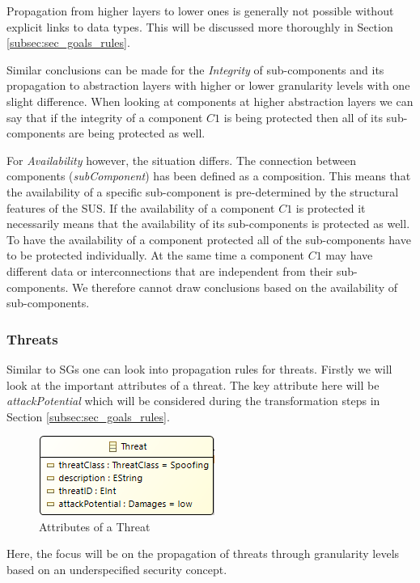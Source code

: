 Propagation from higher layers to lower ones is generally not possible without explicit links to data types. This will be discussed more thoroughly in Section \ref{subsec:sec_goals_rules}.

Similar conclusions can be made for the \textit{Integrity} of sub-components and its propagation to abstraction layers with higher or lower granularity levels with one slight difference. When looking at components at higher abstraction layers we can say that if the integrity of a component $C1$ is being protected then all of its sub-components are being protected as well. 

For \textit{Availability} however, the situation differs. The connection between components (\textit{subComponent}) has been defined as a composition. This means that the availability of a specific sub-component is pre-determined by the structural features of the SUS. If the availability of a component $C1$ is protected it necessarily means that the availability of its sub-components is protected as well. To have the availability of a component protected all of the sub-components have to be protected individually. At the same time a component $C1$ may have different data or interconnections that are independent from their sub-components. We therefore cannot draw conclusions based on the availability of sub-components. 

\subsubsection*{Threats}

Similar to SGs one can look into propagation rules for threats. Firstly we will look at the important attributes of a threat. The key attribute here will be \textit{attackPotential} which will be considered during the transformation steps in Section \ref{subsec:sec_goals_rules}.  
 
\begin{figure}[H]
\centering
\includegraphics[scale=0.85]{pictures/threat.png}
\caption{Attributes of a Threat}
\label{fig:threat}
\end{figure} 

Here, the focus will be on the propagation of threats through granularity levels based on an underspecified security concept.

